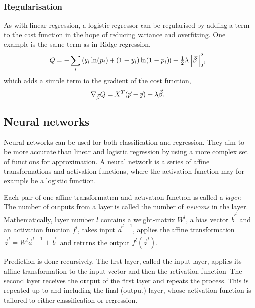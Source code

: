 \documentclass[11pt,british,a4paper]{article}
\numberwithin{equation}{section}
\begin{document}
\subsubsection{Regularisation}
As with linear regression, a logistic regressor can be regularised by adding a term to the cost function in the hope of reducing variance and overfitting.
One example is the same term as in Ridge regression,
\begin{equation}
    Q = - \sum_i \qty(y_i \ln(p_i) + (1-y_i)\ln(1-p_i)) + \tfrac{1}{2}\lambda \norm{\vec{\beta}}_2^2,
\end{equation}
which adds a simple term to the gradient of the cost function,
\begin{equation}
    \nabla_{\vec{\beta}} Q = X^T \qty(\vec{p} - \vec{y}) + \lambda \vec{\beta}.
\end{equation}


\subsection{Neural networks}
Neural networks can be used for both classification and regression.
They aim to be more accurate than linear and logistic regression by using a more complex set of functions for approximation.
A neural network is a series of affine transformations and activation functions, where the activation function may for example be a logistic function.

Each pair of one affine transformation and activation function is called a \emph{layer}. The number of outputs from a layer is called the number of \emph{neurons} in the layer. Mathematically, layer number \(l\) contains a weight-matrix \(W^l\), a bias vector \(\vec{b}^l\) and an activation function \(f^l\), takes input \(\vec{a}^{l-1}\), applies the affine transformation \(\vec{z}^l = W^l \vec{a}^{l-1} + \vec{b}^l\) and returns the output \(f^l(\vec{z}^l)\).

Prediction is done recursively. The first layer, called the input layer, applies its affine transformation to the input vector and then the activation function. The second layer receives the output of the first layer and repeats the process. This is repeated up to and including the final (output) layer, whose activation function is tailored to either classification or regression.
\end{document}
